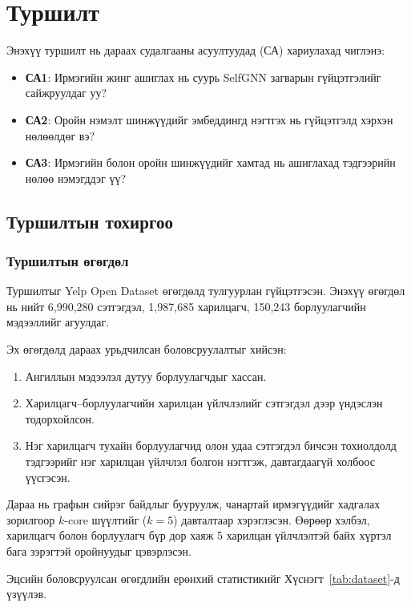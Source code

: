\documentclass[conference]{IEEEtran}
\begin{document}
\section{Туршилт}

Энэхүү туршилт нь дараах судалгааны асуултуудад (СА) хариулахад чиглэнэ:
\begin{itemize}
    \item \textbf{СА1}: Ирмэгийн жинг ашиглах нь суурь SelfGNN загварын гүйцэтгэлийг сайжруулдаг уу?
    \item \textbf{СА2}: Оройн нэмэлт шинжүүдийг эмбеддингд нэгтгэх нь гүйцэтгэлд хэрхэн нөлөөлдөг вэ?
    \item \textbf{СА3}: Ирмэгийн болон оройн шинжүүдийг хамтад нь ашиглахад тэдгээрийн нөлөө нэмэгддэг үү?
\end{itemize}
 
\subsection{Туршилтын тохиргоо}
 
\subsubsection{Туршилтын өгөгдөл}

Туршилтыг Yelp Open Dataset өгөгдөлд тулгуурлан гүйцэтгэсэн. Энэхүү өгөгдөл нь нийт 6{,}990{,}280 сэтгэгдэл, 1{,}987{,}685 харилцагч, 150{,}243 борлуулагчийн мэдээллийг агуулдаг.

Эх өгөгдөлд дараах урьдчилсан боловсруулалтыг хийсэн:
\begin{enumerate}
    \item Ангиллын мэдээлэл дутуу борлуулагчдыг хассан.
    \item Харилцагч–борлуулагчийн харилцан үйлчлэлийг сэтгэгдэл дээр үндэслэн тодорхойлсон.
    \item Нэг харилцагч тухайн борлуулагчид олон удаа сэтгэгдэл бичсэн тохиолдолд тэдгээрийг нэг харилцан үйлчлэл болгон нэгтгэж, давтагдаагүй холбоос үүсгэсэн.
\end{enumerate}

Дараа нь графын сийрэг байдлыг бууруулж, чанартай ирмэгүүдийг хадгалах зорилгоор $k$-core шүүлтийг ($k=5$) давталтаар хэрэглэсэн. Өөрөөр хэлбэл, харилцагч болон борлуулагч бүр дор хаяж 5 харилцан үйлчлэлтэй байх хүртэл бага зэрэгтэй оройнуудыг цэвэрлэсэн.

Эцсийн боловсруулсан өгөгдлийн ерөнхий статистикийг Хүснэгт~\ref{tab:dataset}-д үзүүлэв.
\end{document}
